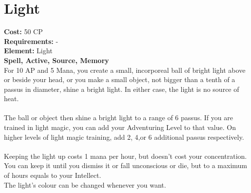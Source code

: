 \section{Light}
\textbf{Cost:} 50 CP\\
\textbf{Requirements:} -\\
\textbf{Element:} Light\\
\textbf{Spell, Active, Source, Memory}\\
For 10 AP and 5 Mana, you create a small, incorporeal ball of bright light above or beside your head, or you make a small object, not bigger than a tenth of a passus in diameter, shine a bright light. In either case, the light is no source of heat.\\
\\
The ball or object then shine a bright light to a range of 6 passus. If you are trained in light magic, you can add your Adventuring Level to that value. On higher levels of light magic training, add 2, 4,or 6 additional passus respectively.\\
\\
Keeping the light up costs 1 mana per hour, but doesn't cost your concentration. You can keep it until you dismiss it or fall unconscious or die, but to a maximum of hours equals to your Intellect.
\\
The light's colour can be changed whenever you want.\\
